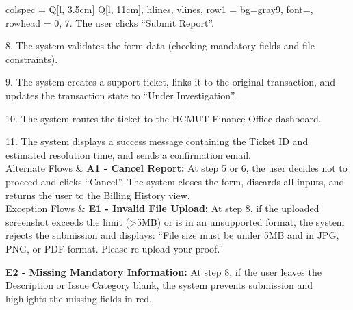 \begin{longtblr}[
  caption = {UC 3.6: Report payment issue},
]{
  colspec = {Q[l, 3.5cm] Q[l, 11cm]}, 
  hlines, vlines,
  row{1} = {bg=gray9, font=\bfseries}, 
  rowhead = 0, 
}
7. The user clicks ``Submit Report''. \par
8. The system validates the form data (checking mandatory fields and file constraints). \par
9. The system creates a support ticket, links it to the original transaction, and updates the transaction state to ``Under Investigation''. \par
10. The system routes the ticket to the HCMUT Finance Office dashboard. \par
11. The system displays a success message containing the Ticket ID and estimated resolution time, and sends a confirmation email. \\
Alternate Flows & 
\textbf{A1 - Cancel Report:} At step 5 or 6, the user decides not to proceed and clicks ``Cancel''. The system closes the form, discards all inputs, and returns the user to the Billing History view. \\
Exception Flows & 
\textbf{E1 - Invalid File Upload:} At step 8, if the uploaded screenshot exceeds the limit (>5MB) or is in an unsupported format, the system rejects the submission and displays: ``File size must be under 5MB and in JPG, PNG, or PDF format. Please re-upload your proof.'' \par \vspace{0.5em}
\textbf{E2 - Missing Mandatory Information:} At step 8, if the user leaves the Description or Issue Category blank, the system prevents submission and highlights the missing fields in red. \\
\end{longtblr}